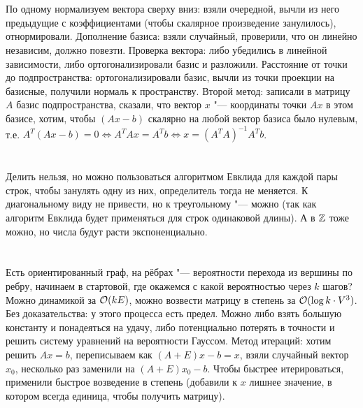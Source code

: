 \section{} %
По одному нормализуем вектора сверху вниз: взяли очередной, вычли из него предыдущие с коэффициентами (чтобы скалярное произведение занулилось), отнормировали.
Дополнение базиса: взяли случайный, проверили, что он линейно независим, должно повезти.
Проверка вектора: либо убедились в линейной зависимости, либо ортогонализировали базис и разложили.
Расстояние от точки до подпространства: ортогонализировали базис, вычли из точки проекции на базисные, получили нормаль к пространству.
Второй метод: записали в матрицу $A$ базис подпространства, сказали, что вектор $x$ "--- координаты точки $Ax$ в этом базисе, хотим, чтобы
$(Ax - b)$ скалярно на любой вектор базиса было нулевым, т.е. $A^T(Ax-b) = 0 \iff A^TAx=A^Tb \iff x=(A^TA)^{-1}A^Tb$.

\section{} %
Делить нельзя, но можно пользоваться алгоритмом Евклида для каждой пары строк, чтобы занулять одну из них, определитель тогда не меняется.
К диагональному виду не привести, но к треугольному "--- можно (так как алгоритм Евклида будет применяться для строк одинаковой длины).
А в $\mathbb{Z}$ тоже можно, но числа будут расти экспоненциально.

\section{} %
Есть ориентированный граф, на рёбрах "--- вероятности перехода из вершины по ребру,
начинаем в стартовой, где окажемся с какой вероятностью через $k$ шагов?
Можно динамикой за $\mathcal{O}(kE)$, можно возвести матрицу в степень за $\mathcal{O}(\log k \cdot V^3)$.
Без доказательства: у этого процесса есть предел.
Можно либо взять большую константу и понадеяться на удачу, либо потенциально потерять в точности и решить систему уравнений на вероятности Гауссом.
Метод итераций: хотим решить $Ax=b$, переписываем как $(A+E)x-b=x$, взяли случайный вектор $x_0$, несколько раз заменили на $(A+E)x_0-b$.
Чтобы быстрее итерироваться, применили быстрое возведение в степень (добавили к $x$ лишнее значение, в котором всегда единица, чтобы получить матрицу).
